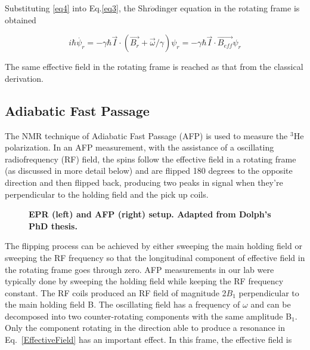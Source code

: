 Substituting \ref{eq4} into Eq.\ref{eq3}, the Shr$\ddot{o}$dinger equation in the rotating frame is obtained

\begin{equation}
i\hbar \dot{\psi_{r}}=-\gamma \hbar \vec{I}\cdot(\vec{B_{r}} + \vec{\omega}/\gamma)\psi_{r}=-\gamma \hbar \vec{I}\cdot\vec{B_{eff}}\psi_{r}
\end{equation}

The same effective field in the rotating frame is reached as that from the classical derivation.

\subsection{Adiabatic Fast Passage}

The NMR technique of Adiabatic Fast Passage (AFP) is used to measure the $^{3}$He polarization. In an AFP measurement, with the assistance of a oscillating radiofrequency (RF) field, the spins follow the effective field in a rotating frame (as discussed in more detail below) and are flipped 180 degrees to the opposite direction and then flipped back, producing two peaks in signal when they're perpendicular to the holding field and the pick up coils.

\begin{figure}[H]
	\centering
	\caption{{\bf EPR (left) and AFP (right) setup. Adapted from Dolph's PhD thesis.}}
	\label{AFPandEPRsetup}
\end{figure}

The flipping process can be achieved by either sweeping the main holding field or sweeping the RF frequency so that the longitudinal component of effective field in the rotating frame goes through zero. AFP measurements in our lab were typically done by sweeping the holding field while keeping the RF frequency constant. The RF coils produced an RF field of magnitude 2$B_{1}$ perpendicular to the main holding field B. The oscillating field has a frequency of $\omega$ and can be decomposed into two counter-rotating components with the same amplitude B$_{1}$. Only the component rotating in the direction able to produce a resonance in Eq.~\ref{EffectiveField} has an important effect. In this frame, the effective field is


